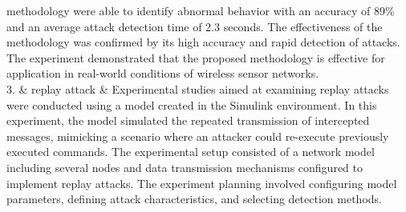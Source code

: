 \begin{longtable}[]
methodology were able to identify abnormal behavior with an accuracy of
89\% and an average attack detection time of 2.3 seconds. The
effectiveness of the methodology was confirmed by its high accuracy and
rapid detection of attacks. The experiment demonstrated that the
proposed methodology is effective for application in real-world
conditions of wireless sensor networks. \\
3. & replay attack & Experimental studies aimed at examining replay
attacks were conducted using a model created in the Simulink
environment. In this experiment, the model simulated the repeated
transmission of intercepted messages, mimicking a scenario where an
attacker could re-execute previously executed commands. The experimental
setup consisted of a network model including several nodes and data
transmission mechanisms configured to implement replay attacks. The
experiment planning involved configuring model parameters, defining
attack characteristics, and selecting detection methods.


\end{longtable}
